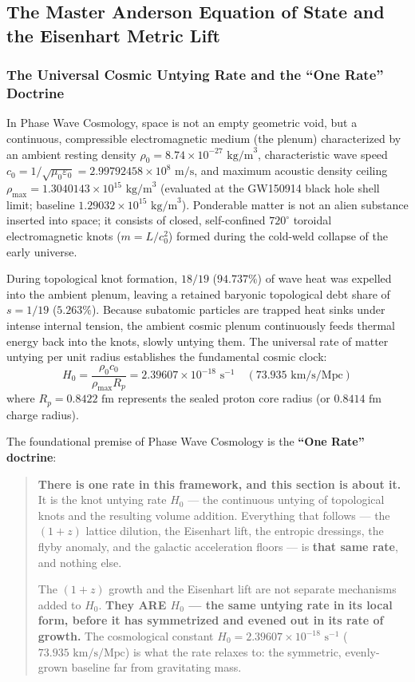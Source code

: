 \documentclass[11pt,a4paper]{article}
\begin{document}
\subsection{The Master Anderson Equation of State and the Eisenhart Metric Lift}
\label{subsec:master_anderson_eos}

\subsubsection{The Universal Cosmic Untying Rate and the ``One Rate'' Doctrine}
\label{subsubsec:one_rate_doctrine}

In Phase Wave Cosmology, space is not an empty geometric void, but a continuous, compressible electromagnetic medium (the plenum) characterized by an ambient resting density $\rho_0 = 8.74 \times 10^{-27}\text{ kg/m}^3$, characteristic wave speed $c_0 = 1/\sqrt{\mu_0\varepsilon_0} = 2.99792458 \times 10^8\text{ m/s}$, and maximum acoustic density ceiling $\rho_{\max} = 1.3040143 \times 10^{15}\text{ kg/m}^3$ (evaluated at the GW150914 black hole shell limit; baseline $1.29032 \times 10^{15}\text{ kg/m}^3$). Ponderable matter is not an alien substance inserted into space; it consists of closed, self-confined $720^\circ$ toroidal electromagnetic knots ($m = L/c_0^2$) formed during the cold-weld collapse of the early universe.

During topological knot formation, $18/19$ ($94.737\%$) of wave heat was expelled into the ambient plenum, leaving a retained baryonic topological debt share of $s = 1/19$ ($5.263\%$). Because subatomic particles are trapped heat sinks under intense internal tension, the ambient cosmic plenum continuously feeds thermal energy back into the knots, slowly untying them. The universal rate of matter untying per unit radius establishes the fundamental cosmic clock:
\begin{equation}
H_0 = \frac{\rho_0 c_0}{\rho_{\max} R_p} = 2.39607 \times 10^{-18}\text{ s}^{-1} \quad (73.935\text{ km/s/Mpc})
\label{eq:h0_untying_rate}
\end{equation}
where $R_p = 0.8422\text{ fm}$ represents the sealed proton core radius (or $0.8414\text{ fm}$ charge radius).

The foundational premise of Phase Wave Cosmology is the \textbf{``One Rate'' doctrine}:
\begin{quote}
\textbf{There is one rate in this framework, and this section is about it.} It is the knot untying rate $H_0$ --- the continuous untying of topological knots and the resulting volume addition. Everything that follows --- the $(1+z)$ lattice dilution, the Eisenhart lift, the entropic dressings, the flyby anomaly, and the galactic acceleration floors --- is \textbf{that same rate}, and nothing else.

The $(1+z)$ growth and the Eisenhart lift are not separate mechanisms added to $H_0$. \textbf{They ARE $H_0$ --- the same untying rate in its local form, before it has symmetrized and evened out in its rate of growth.} The cosmological constant $H_0 = 2.39607 \times 10^{-18}\text{ s}^{-1}$ ($73.935\text{ km/s/Mpc}$) is what the rate relaxes to: the symmetric, evenly-grown baseline far from gravitating mass.
\end{quote}
\end{document}
